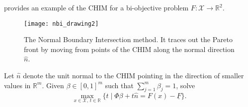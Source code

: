 \documentclass[main.tex]{subfiles}
\begin{document}
\begin{example}
   provides an example of the CHIM for a
  bi-objective problem $F:\mathcal{X}\to\mathbb{R}^2$.
  \begin{figure}[htbp]
    \centering
    \texttt{[image: nbi\_drawing2]}
    \caption{The Normal Boundary Intersection method. It traces out the
      Pareto front by moving from points of the CHIM along the normal
      direction $\hat n$.}\label{fig:nbi_drawing2}
  \end{figure}
\end{example}

\begin{mydef}
  Let $\hat{n}$ denote the unit normal to the CHIM pointing in the
  direction of smaller values in $\mathbb{R}^m$.
  Given $\beta\in{[0,1]}^m$ such that
  $\sum_{j=1}^m\beta_j=1$, solve
  \begin{equation}
    \max_{x\in\mathcal{X},\,t\in\mathbb{R}} \{t \mid \Phi\beta +
    t\hat{n} = F(x) - \underline{F}\}.
  \end{equation}
\end{mydef}
\end{document}
